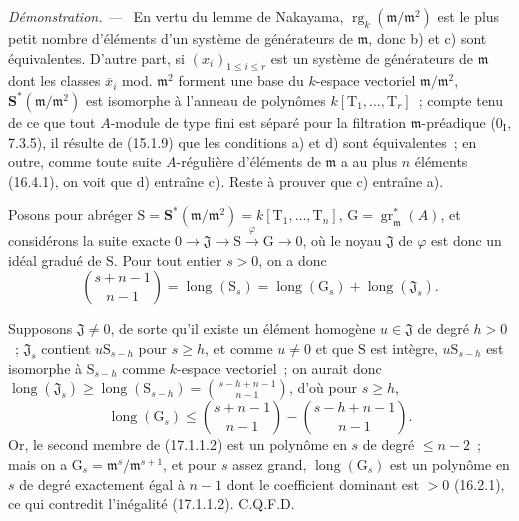 \documentclass[10pt,oneside]{book}
\newcommand{\oldpage}[2][]{%
  \setcounter{footnote}{0}%
  \marginpar{\scriptsize\textbf{#1}~|~#2}\ignorespaces}
\newenvironment{proof}{%
  \par\medskip\noindent\textit{Démonstration. ---\ }}{\par}
\begin{document}
\begin{proof}
En vertu du lemme de Nakayama,
$\operatorname{rg}_k(\mathfrak{m}/\mathfrak{m}^2)$ est le plus petit nombre
d'éléments d'un système de générateurs de $\mathfrak{m}$, donc b) et c) sont
équivalentes. D'autre part, si $(x_i)_{1\leq i\leq r}$ est un système de
générateurs de $\mathfrak{m}$ dont les classes $\overline{x}_i$ mod.
$\mathfrak{m}^2$ forment une base du $k$-espace vectoriel
$\mathfrak{m}/\mathfrak{m}^2$, $\mathbf{S}^*(\mathfrak{m}/\mathfrak{m}^2)$
est isomorphe à l'anneau de
\oldpage[0\textsubscript{IV-1}]{40}
polynômes $k[\mathrm{T}_1,\ldots,\mathrm{T}_r]$~; compte tenu de ce que tout
$A$-module de type fini est séparé pour la filtration $\mathfrak{m}$-préadique
($0_{\mathrm I}$, 7.3.5), il résulte de (15.1.9) que les conditions a) et d)
sont équivalentes~; en outre, comme toute suite $A$-régulière d'éléments de
$\mathfrak{m}$ a au plus $n$ éléments (16.4.1), on voit que d) entraîne c).
Reste à prouver que c) entraîne a).

Posons pour abréger
$\mathrm{S}=\mathbf{S}^*(\mathfrak{m}/\mathfrak{m}^2)
=k[\mathrm{T}_1,\ldots,\mathrm{T}_n]$,
$\mathrm{G}=\operatorname{gr}^*_{\mathfrak{m}}(A)$, et considérons la suite
exacte
$0\longrightarrow\mathfrak{J}\longrightarrow\mathrm{S}
\xrightarrow{\varphi}\mathrm{G}\longrightarrow0$, où le noyau
$\mathfrak{J}$ de $\varphi$ est donc un idéal gradué de $\mathrm{S}$. Pour
tout entier $s>0$, on a donc
\begin{equation}
\label{0.17.1.1.1-fr}
\tag{17.1.1.1}
  \binom{s+n-1}{n-1}
  =\operatorname{long}(\mathrm{S}_s)
  =\operatorname{long}(\mathrm{G}_s)
  +\operatorname{long}(\mathfrak{J}_s).
\end{equation}

Supposons $\mathfrak{J}\neq0$, de sorte qu'il existe un élément homogène
$u\in\mathfrak{J}$ de degré $h>0$~; $\mathfrak{J}_s$ contient
$u\mathrm{S}_{s-h}$ pour $s\geq h$, et comme $u\neq0$ et que $\mathrm{S}$ est
intègre, $u\mathrm{S}_{s-h}$ est isomorphe à $\mathrm{S}_{s-h}$ comme
$k$-espace vectoriel~; on aurait donc
$\operatorname{long}(\mathfrak{J}_s)\geq
\operatorname{long}(\mathrm{S}_{s-h})=\binom{s-h+n-1}{n-1}$, d'où pour
$s\geq h$,
\begin{equation}
\label{0.17.1.1.2-fr}
\tag{17.1.1.2}
  \operatorname{long}(\mathrm{G}_s)
  \leq\binom{s+n-1}{n-1}-\binom{s-h+n-1}{n-1}.
\end{equation}
Or, le second membre de (17.1.1.2) est un polynôme en $s$ de degré
$\leq n-2$~; mais on a
$\mathrm{G}_s=\mathfrak{m}^s/\mathfrak{m}^{s+1}$, et pour $s$ assez grand,
$\operatorname{long}(\mathrm{G}_s)$ est un polynôme en $s$ de degré exactement
égal à $n-1$ dont le coefficient dominant est $>0$ (16.2.1), ce qui contredit
l'inégalité (17.1.1.2). C.Q.F.D.
\end{proof}
\end{document}
